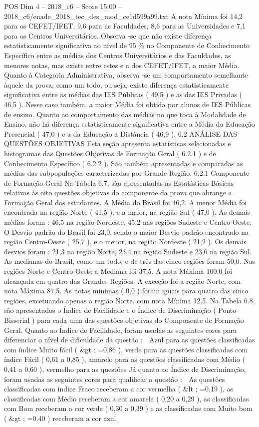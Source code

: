 \begin{textsample}{POS Dim 4 – 2018\_c6 – Score 15.00 – 2018\_c6/enade\_2018\_tec\_des\_mod\_ce1d599a99.txt}
A nota Mínima foi 14,2 para os CEFET/IFET, 9,6 para as Faculdades, 8,6 para as Universidades e 7,1 para os Centros Universitários.
Observa -se que não existe diferença estatisticamente significativa ao nível de 95 \% no Componente de Conhecimento Específico entre as médias dos Centros Universitários e das Faculdades, as menores notas, mas existe entre estes e a dos CEFET/IFET, a maior Média.
Quanto à Categoria Administrativa, observa -se um comportamento semelhante àquele da prova, como um todo, ou seja, existe diferença estatisticamente significativa entre as médias das IES Públicas ( 49,5 ) e as das IES Privadas ( 46,5 ).
Nesse caso também, a maior Média foi obtida por alunos de IES Públicas de ensino.
Quanto ao comportamento das médias no que toca à Modalidade de Ensino, não há diferença estatisticamente significativa entre a Média da Educação Presencial ( 47,0 ) e a da Educação a Distância ( 46,9 ). 6.2 ANÁLISE DAS QUESTÕES OBJETIVAS Esta seção apresenta estatísticas selecionadas e histogramas das Questões Objetivas de Formação Geral ( 6.2.1 ) e de Conhecimento Específico ( 6.2.2 ).
São também apresentadas e comparadas as médias das subpopulações caracterizadas por Grande Região. 6.2.1 Componente de Formação Geral Na Tabela 6.7, são apresentadas as Estatísticas Básicas relativas às oito questões objetivas do componente da prova que abrange a Formação Geral dos estudantes.
A Média do Brasil foi 46,2.
A menor Média foi encontrada na região Norte ( 41,5 ), e a maior, na região Sul ( 47,0 ).
As demais médias foram : 46,5 na região Nordeste, 45,2 nas regiões Sudeste e Centro-Oeste.
O Desvio padrão do Brasil foi 23,0, sendo o maior Desvio padrão encontrado na região Centro-Oeste ( 25,7 ), e o menor, na região Nordeste ( 21,2 ).
Os demais desvios foram : 21,3 na região Norte, 23,4 na região Sudeste e 23,6 na região Sul.
As medianas do Brasil, como um todo, e de três das cinco regiões foram 50,0.
Nas regiões Norte e Centro-Oeste a Mediana foi 37,5.
A nota Máxima 100,0 foi alcançada em quatro das Grandes Regiões.
A exceção foi a região Norte, com nota Máxima 87,5.
As notas mínimas ( 0,0 ) foram iguais para quatro das cinco regiões, excetuando apenas a região Norte, com nota Mínima 12,5.
Na Tabela 6.8, são apresentados o Índice de Facilidade e o Índice de Discriminação ( Ponto-Bisserial ) para cada uma das questões objetivas do Componente de Formação Geral.
Quanto ao Índice de Facilidade, foram usadas as seguintes cores para diferenciar o nível de dificuldade da questão :  Azul para as questões classificadas com índice Muito fácil ( \&gt ; =0,86 ), verde para as questões classificadas com índice Fácil ( 0,61 a 0,85 ), amarelo para as questões classificadas com Médio ( 0,41 a 0,60 ), vermelho para as questões Já quanto ao Índice de Discriminação, foram usadas as seguintes cores para qualificar a questão :  As questões classificadas com índice Fraco receberam a cor vermelha ( \&lt ; =0,19 ), as classificadas com Médio receberam a cor amarela ( 0,20 a 0,29 ), as classificadas com Bom receberam a cor verde ( 0,30 a 0,39 ) e as classificadas com Muito bom ( \&gt ; =0,40 ) receberam a cor azul.

\end{textsample}
